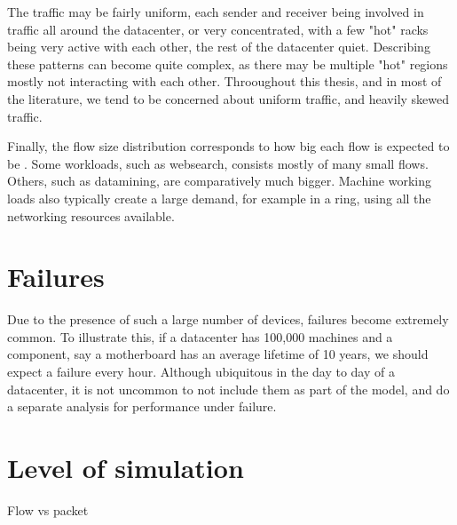 The traffic may be fairly uniform, each sender and receiver being involved in traffic all around the datacenter, or very concentrated, with a few "hot" racks being very active with each other, the rest of the datacenter quiet.
Describing these patterns can become quite complex, as there may be multiple "hot" regions mostly not interacting with each other.
Throoughout this thesis, and in most of the literature, we tend to be concerned about uniform traffic, and heavily skewed traffic. %

Finally, the flow size distribution corresponds to how big each flow is expected to be \cite{alizadeh_data_2010}.
Some workloads, such as websearch, consists mostly of many small flows.
Others, such as datamining, are comparatively much bigger.
Machine working loads also typically create a large demand, for example in a ring, using all the networking resources available.

\section{Failures} \label{failures} %

Due to the presence of such a large number of devices, failures become extremely common. %
To illustrate this, if a datacenter has 100,000 machines and a component, say a motherboard has an average lifetime of 10 years, we should expect a failure every hour.
Although ubiquitous in the day to day of a datacenter, it is not uncommon to not include them as part of the model, and do a separate analysis for performance under failure. %

\section{Level of simulation} \label{model-level}

Flow vs packet


